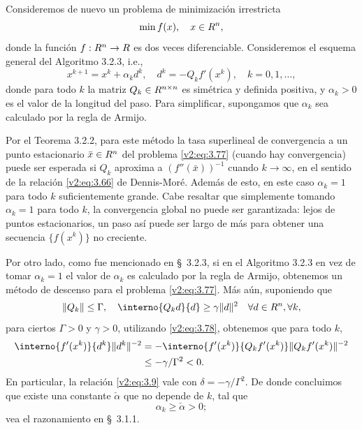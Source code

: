 Consideremos de nuevo un problema de minimización irrestricta
\begin{equation}
    \min f(x), \quad x \in R^n,
    \label{v2:eq:3.77}
\end{equation}
donde la función $f: R^n \to R$ es dos veces diferenciable. Consideremos el esquema general del Algoritmo 3.2.3, i.e.,
\begin{equation}
    x^{k+1} = x^k + \alpha_k d^k, \quad d^k = -Q_k f'(x^k), \quad k = 0, 1, \dots,
    \label{v2:eq:3.78}
\end{equation}
donde para todo $k$ la matriz $Q_k \in R^{n \times n}$ es simétrica y definida positiva, y $\alpha_k > 0$ es el valor de la longitud del paso. Para simplificar, supongamos que $\alpha_k$ sea calculado por la regla de Armijo.

Por el Teorema 3.2.2, para este método la tasa superlineal de convergencia a un punto estacionario $\bar{x} \in R^n$ del problema \eqref{v2:eq:3.77} (cuando hay convergencia) puede ser esperada si $Q_k$ aproxima a $(f''(\bar{x}))^{-1}$ cuando $k \to \infty$, en el sentido de la relación \eqref{v2:eq:3.66} de Dennis-Moré. Además de esto, en este caso $\alpha_k = 1$ para todo $k$ suficientemente grande. Cabe resaltar que simplemente tomando $\alpha_k = 1$ para todo $k$, la convergencia global no puede ser garantizada: lejos de puntos estacionarios, un paso así puede ser largo de más para obtener una secuencia $\{f(x^k)\}$ no creciente.

Por otro lado, como fue mencionado en \S~3.2.3, si en el Algoritmo 3.2.3 en vez de tomar $\alpha_k = 1$ el valor de $\alpha_k$ es calculado por la regla de Armijo, obtenemos un método de descenso para el problema \eqref{v2:eq:3.77}. Más aún, suponiendo que
\begin{equation}
    \|Q_k\| \le \Gamma, \quad \interno{Q_k d}{d} \ge \gamma \|d\|^2 \quad \forall d \in \Rn, \forall k,
    \label{v2:eq:3.79}
\end{equation}
para ciertos $\Gamma > 0$ y $\gamma > 0$, utilizando \eqref{v2:eq:3.78}, obtenemos que para todo $k$,
\begin{align}
    \interno{f'(x^k)}{d^k}\|d^k\|^{-2} &= -\interno{f'(x^k)}{Q_k f'(x^k)}\|Q_k f'(x^k)\|^{-2} \nonumber \\
    &\le -\gamma/\Gamma^2 < 0.
    \label{v2:eq:3.80}
\end{align}
En particular, la relación \eqref{v2:eq:3.9} vale con $\delta = -\gamma/\Gamma^2$. De donde concluimos que existe una constante $\check{\alpha}$ que no depende de $k$, tal que
\begin{equation}
    \alpha_k \ge \check{\alpha} > 0;
    \label{v2:eq:3.81}
\end{equation}
vea el razonamiento en \S~3.1.1.

